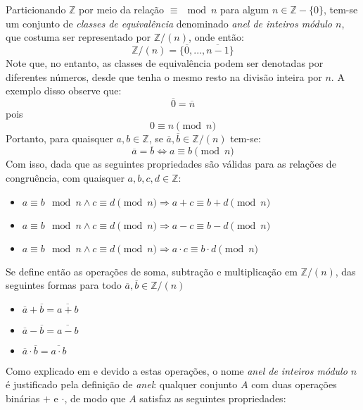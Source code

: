 Particionando $\mathbb{Z}$ por meio da relação $\equiv \mod n$ para algum $n \in \mathbb{Z} - \{0\}$, tem-se um conjunto de \textit{classes de equivalência} denominado \textit{anel de inteiros módulo $n$}, que costuma ser representado por $\mathbb{Z}/(n)$, onde então:
\begin{equation*}
    \mathbb{Z}/(n) = \{\overline{0}, ..., \overline{n - 1}\}
\end{equation*}
Note que, no entanto, as classes de equivalência podem ser denotadas por diferentes números, desde que tenha o mesmo resto na divisão inteira por $n$. A exemplo disso observe que:
\begin{equation*}
    \overline{0} = \overline{n}
\end{equation*}
pois
\begin{equation}
    0 \equiv n \pmod{n}
\end{equation}
Portanto, para quaisquer $a, b \in \mathbb{Z}$, se $\overline{a}, \overline{b} \in \mathbb{Z}/(n)$ tem-se:
\begin{equation*}
    \overline{a} = \overline{b} \Longleftrightarrow a \equiv b \pmod{n}
\end{equation*}
Com isso, dada que as seguintes propriedades são válidas para as relações de congruência, com quaisquer $a, b, c, d \in \mathbb{Z}$:
\begin{itemize}
    \item $a \equiv b \mod n \land c \equiv d \pmod{n} \Rightarrow a + c \equiv b + d \pmod{n}$
    \item $a \equiv b \mod n \land c \equiv d \pmod{n} \Rightarrow a - c \equiv b - d \pmod{n}$
    \item $a \equiv b \mod n \land c \equiv d \pmod{n} \Rightarrow a \cdot c \equiv b \cdot d \pmod{n}$
\end{itemize}
Se define então as operações de soma, subtração e multiplicação em $\mathbb{Z}/(n)$, das seguintes formas para todo $\overline{a}, \overline{b} \in \mathbb{Z}/(n)$
\begin{itemize}
    \item $\overline{a} + \overline{b} = \overline{a + b}$
    \item $\overline{a} - \overline{b} = \overline{a - b}$
    \item $\overline{a} \cdot \overline{b} = \overline{a \cdot b}$
\end{itemize}
Como explicado em \cite{book:2399854} e devido a estas operações, o nome \textit{anel de inteiros módulo $n$} é justificado pela definição de \textit{anel}: qualquer conjunto $A$ com duas operações binárias $+$ e $\cdot$, de modo que $A$ satisfaz as seguintes propriedades:
